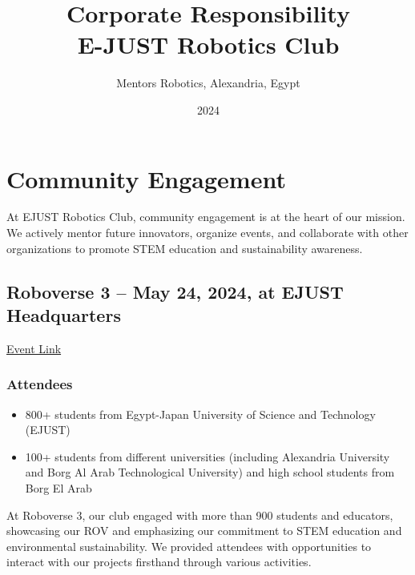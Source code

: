 \documentclass[a4paper,12pt]{article}
\title{Corporate Responsibility \\ \large E-JUST Robotics Club}
\author{Mentors Robotics, Alexandria, Egypt}
\date{2024}
\begin{document}
\maketitle
\newpage
\tableofcontents
\newpage

\section{Community Engagement}
At EJUST Robotics Club, community engagement is at the heart of our mission. We actively mentor future innovators, organize events, and collaborate with other organizations to promote STEM education and sustainability awareness.

\subsection{Roboverse 3 – May 24, 2024, at EJUST Headquarters}
\href{https://fb.me/e/3yvYdIh8P/}{Event Link}

\subsubsection{Attendees}
\begin{itemize}
    \item 800+ students from Egypt-Japan University of Science and Technology (EJUST)
    \item 100+ students from different universities (including Alexandria University and Borg Al Arab Technological University) and high school students from Borg El Arab
\end{itemize}

At Roboverse 3, our club engaged with more than 900 students and educators, showcasing our ROV and emphasizing our commitment to STEM education and environmental sustainability. We provided attendees with opportunities to interact with our projects firsthand through various activities.
\end{document}
